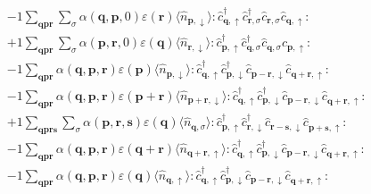 \begin{align*}
	&-1 \sum_{ \mathbf{q} \mathbf{p} \mathbf{r} } \sum_{ \sigma } \alpha( \mathbf{q}, \mathbf{p}, 0 )  \varepsilon( \mathbf{r} )   \langle \hat{n}_{ \mathbf{p}, \downarrow } \rangle :\hat{c}_{ \mathbf{q}, \uparrow }^\dagger \hat{c}_{ \mathbf{r}, \sigma }^\dagger \hat{c}_{ \mathbf{r}, \sigma }^{\phantom{\dagger}}\hat{c}_{ \mathbf{q}, \uparrow }^{\phantom{\dagger}}: \\
	&+1 \sum_{ \mathbf{q} \mathbf{p} \mathbf{r} } \sum_{ \sigma } \alpha( \mathbf{p}, \mathbf{r}, 0 )  \varepsilon( \mathbf{q} )   \langle \hat{n}_{ \mathbf{r}, \downarrow } \rangle :\hat{c}_{ \mathbf{p}, \uparrow }^\dagger \hat{c}_{ \mathbf{q}, \sigma }^\dagger \hat{c}_{ \mathbf{q}, \sigma }^{\phantom{\dagger}}\hat{c}_{ \mathbf{p}, \uparrow }^{\phantom{\dagger}}: \\
	&-1 \sum_{ \mathbf{q} \mathbf{p} \mathbf{r} } \alpha( \mathbf{q}, \mathbf{p}, \mathbf{r} )  \varepsilon( \mathbf{p} )   \langle \hat{n}_{ \mathbf{p}, \downarrow } \rangle :\hat{c}_{ \mathbf{q}, \uparrow }^\dagger \hat{c}_{ \mathbf{p}, \downarrow }^\dagger \hat{c}_{ \mathbf{p}-\mathbf{r}, \downarrow }^{\phantom{\dagger}}\hat{c}_{ \mathbf{q}+\mathbf{r}, \uparrow }^{\phantom{\dagger}}: \\
	&-1 \sum_{ \mathbf{q} \mathbf{p} \mathbf{r} } \alpha( \mathbf{q}, \mathbf{p}, \mathbf{r} )  \varepsilon( \mathbf{p}+\mathbf{r} )   \langle \hat{n}_{ \mathbf{p}+\mathbf{r}, \downarrow } \rangle :\hat{c}_{ \mathbf{q}, \uparrow }^\dagger \hat{c}_{ \mathbf{p}, \downarrow }^\dagger \hat{c}_{ \mathbf{p}-\mathbf{r}, \downarrow }^{\phantom{\dagger}}\hat{c}_{ \mathbf{q}+\mathbf{r}, \uparrow }^{\phantom{\dagger}}: \\
	&+1 \sum_{ \mathbf{q} \mathbf{p} \mathbf{r} \mathbf{s} } \sum_{ \sigma } \alpha( \mathbf{p}, \mathbf{r}, \mathbf{s} )  \varepsilon( \mathbf{q} )   \langle \hat{n}_{ \mathbf{q}, \sigma } \rangle :\hat{c}_{ \mathbf{p}, \uparrow }^\dagger \hat{c}_{ \mathbf{r}, \downarrow }^\dagger \hat{c}_{ \mathbf{r}-\mathbf{s}, \downarrow }^{\phantom{\dagger}}\hat{c}_{ \mathbf{p}+\mathbf{s}, \uparrow }^{\phantom{\dagger}}: \\
	&-1 \sum_{ \mathbf{q} \mathbf{p} \mathbf{r} } \alpha( \mathbf{q}, \mathbf{p}, \mathbf{r} )  \varepsilon( \mathbf{q}+\mathbf{r} )   \langle \hat{n}_{ \mathbf{q}+\mathbf{r}, \uparrow } \rangle :\hat{c}_{ \mathbf{q}, \uparrow }^\dagger \hat{c}_{ \mathbf{p}, \downarrow }^\dagger \hat{c}_{ \mathbf{p}-\mathbf{r}, \downarrow }^{\phantom{\dagger}}\hat{c}_{ \mathbf{q}+\mathbf{r}, \uparrow }^{\phantom{\dagger}}: \\
	&-1 \sum_{ \mathbf{q} \mathbf{p} \mathbf{r} } \alpha( \mathbf{q}, \mathbf{p}, \mathbf{r} )  \varepsilon( \mathbf{q} )   \langle \hat{n}_{ \mathbf{q}, \uparrow } \rangle :\hat{c}_{ \mathbf{q}, \uparrow }^\dagger \hat{c}_{ \mathbf{p}, \downarrow }^\dagger \hat{c}_{ \mathbf{p}-\mathbf{r}, \downarrow }^{\phantom{\dagger}}\hat{c}_{ \mathbf{q}+\mathbf{r}, \uparrow }^{\phantom{\dagger}}: \\

\end{align*}
